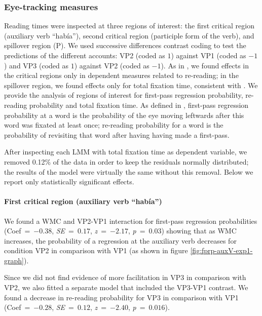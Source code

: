 \documentclass{frontiersSCNS}\usepackage{knitr}
\begin{document}
\subsubsection{Eye-tracking measures}
Reading times were inspected at three regions of interest: the first critical region (auxiliary verb ``había''), second critical region (participle form of the verb), and spillover region (P). We used successive differences contrast coding to test the predictions of the different accounts: VP2 (coded as $1$) against VP1 (coded as $-1$) and VP3 (coded as $1$) against VP2 (coded as $-1$). As in \citet{VasishthDrenhaus2011}, we found effects in the critical regions only in dependent measures related to re-reading;  in the spillover region, we found effects only for total fixation time, consistent with \citet{LevyKeller2012}. We provide the analysis of regions of interest for first-pass regression probability, re-reading probability and total fixation time. As defined in \citet{VasishthDrenhaus2011},  first-pass regression probability at a word is the probability of the eye moving leftwards after this word was fixated at least once;  re-reading probability for a word is the probability of revisiting that word after having having made a first-pass.

After inspecting each LMM with total fixation time as dependent variable, we removed 0.12\% of the data in order to keep the residuals normally distributed; the results of the model were virtually the same without this removal. Below we report only statistically significant effects.

\paragraph{First critical region (auxiliary verb ``había'')}
We found a WMC and VP2-VP1 interaction for first-pass regression probabilities  (\mbox{Coef = $-0.38$}, \mbox{\textit{SE} = $0.17$}, \mbox{\textit{z} = $-2.17$}, \mbox{\textit{p} = $0.03$}) showing that as WMC increases, the probability of a regression at the auxiliary verb decreases for condition VP2  in comparison with VP1 (as shown in figure \ref{fig:fprp-auxV-exp1-graph}).




Since we did not find evidence of more facilitation in VP3 in comparison with VP2, we also fitted a separate model that included the VP3-VP1 contrast. We found a decrease in re-reading probability for VP3 in comparison with VP1 (\mbox{Coef = $-0.28$}, \mbox{\textit{SE} = $0.12$}, \mbox{\textit{z} = $-2.40$}, \mbox{\textit{p} = $0.016$}).
\end{document}
